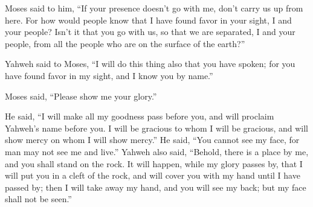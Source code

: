 {\par }{\PP {}Moses said to him, “If your presence doesn’t go with me, don’t carry us up from here.
For how would people know that I have found favor in your sight, I and your people? Isn’t it that you go with us, so that we are separated, I and your people, from all the people who are on the surface of the earth?”
\par }{\PP {}Yahweh said to Moses, “I will do this thing also that you have spoken; for you have found favor in my sight, and I know you by name.”
\par }{\PP {}Moses said, “Please show me your glory.”
\par }{\PP {}He said, “I will make all my goodness pass before you, and will proclaim Yahweh’s name before you. I will be gracious to whom I will be gracious, and will show mercy on whom I will show mercy.”
He said, “You cannot see my face, for man may not see me and live.”
Yahweh also said, “Behold, there is a place by me, and you shall stand on the rock.
It will happen, while my glory passes by, that I will put you in a cleft of the rock, and will cover you with my hand until I have passed by;
then I will take away my hand, and you will see my back; but my face shall not be seen.”

}
